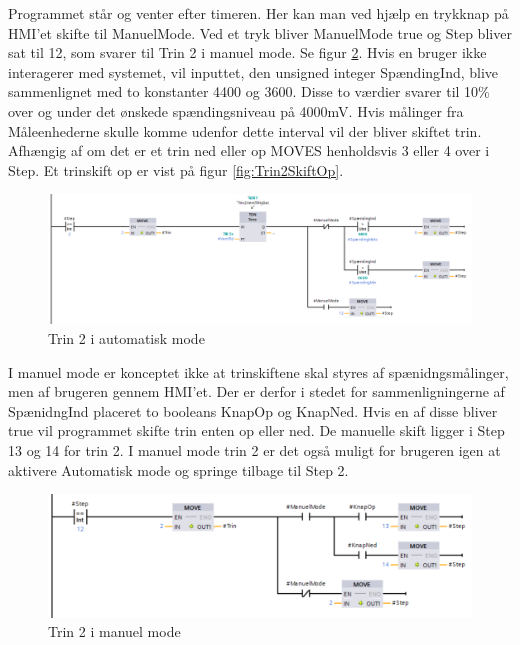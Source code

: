 Programmet står og venter efter timeren. Her kan man ved hjælp en trykknap på HMI'et skifte til ManuelMode. Ved et tryk bliver ManuelMode true og Step bliver sat til 12, som svarer til Trin 2 i manuel mode. Se figur \ref{fig:Trin2ManuelMode}. Hvis en bruger ikke interagerer med systemet, vil inputtet, den unsigned integer SpændingInd, blive sammenlignet med to konstanter 4400 og 3600. Disse to værdier svarer til 10\% over og under det ønskede spændingsniveau på 4000mV. Hvis målinger fra Måleenhederne skulle komme udenfor dette interval vil der bliver skiftet trin. Afhængig af om det er et trin ned eller op MOVES henholdsvis 3 eller 4 over i Step.
Et trinskift op er vist på figur \ref{fig:Trin2SkiftOp}.

\begin{figure}[H] %
	\centering
	\includegraphics[width=1\textwidth]{Figure/Trin2AutomatiskMode}
	\caption{Trin 2 i automatisk mode}
	\label{fig:Trin2AutomatiskMode}
\end{figure}

I manuel mode er konceptet ikke at trinskiftene skal styres af spænidngsmålinger, men af brugeren gennem HMI'et. Der er derfor i stedet for sammenligningerne af SpænidngInd placeret to booleans KnapOp og KnapNed. Hvis en af disse bliver true vil programmet skifte trin enten op eller ned. De manuelle skift ligger i Step 13 og 14 for trin 2. I manuel mode trin 2 er det også muligt for brugeren igen at aktivere Automatisk mode og springe tilbage til Step 2.

\begin{figure}[H] %
	\centering
	\includegraphics[width=1\textwidth]{Figure/Trin2ManuelMode}
	\caption{Trin 2 i manuel mode}
	\label{fig:Trin2ManuelMode}
\end{figure}

